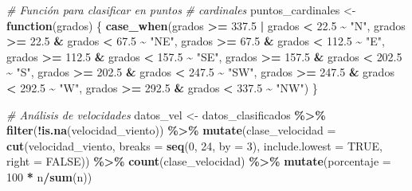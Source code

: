 \documentclass[
]{article}
\newenvironment{Shaded}{\begin{snugshade}}{\end{snugshade}}
\newcommand{\AttributeTok}[1]{\textcolor[rgb]{0.13,0.29,0.53}{#1}}
\newcommand{\CommentTok}[1]{\textcolor[rgb]{0.56,0.35,0.01}{\textit{#1}}}
\newcommand{\ConstantTok}[1]{\textcolor[rgb]{0.56,0.35,0.01}{#1}}
\newcommand{\ControlFlowTok}[1]{\textcolor[rgb]{0.13,0.29,0.53}{\textbf{#1}}}
\newcommand{\DecValTok}[1]{\textcolor[rgb]{0.00,0.00,0.81}{#1}}
\newcommand{\FloatTok}[1]{\textcolor[rgb]{0.00,0.00,0.81}{#1}}
\newcommand{\FunctionTok}[1]{\textcolor[rgb]{0.13,0.29,0.53}{\textbf{#1}}}
\newcommand{\NormalTok}[1]{#1}
\newcommand{\OtherTok}[1]{\textcolor[rgb]{0.56,0.35,0.01}{#1}}
\newcommand{\SpecialCharTok}[1]{\textcolor[rgb]{0.81,0.36,0.00}{\textbf{#1}}}
\newcommand{\StringTok}[1]{\textcolor[rgb]{0.31,0.60,0.02}{#1}}
\begin{document}
\begin{Shaded}
\begin{Highlighting}[]
\CommentTok{\# Función para clasificar en puntos}
\CommentTok{\# cardinales}
\NormalTok{puntos\_cardinales }\OtherTok{\textless{}{-}} \ControlFlowTok{function}\NormalTok{(grados) \{}
    \FunctionTok{case\_when}\NormalTok{(grados }\SpecialCharTok{\textgreater{}=} \FloatTok{337.5} \SpecialCharTok{|}\NormalTok{ grados }\SpecialCharTok{\textless{}}
        \FloatTok{22.5} \SpecialCharTok{\textasciitilde{}} \StringTok{"N"}\NormalTok{, grados }\SpecialCharTok{\textgreater{}=} \FloatTok{22.5} \SpecialCharTok{\&}\NormalTok{ grados }\SpecialCharTok{\textless{}}
        \FloatTok{67.5} \SpecialCharTok{\textasciitilde{}} \StringTok{"NE"}\NormalTok{, grados }\SpecialCharTok{\textgreater{}=} \FloatTok{67.5} \SpecialCharTok{\&}\NormalTok{ grados }\SpecialCharTok{\textless{}}
        \FloatTok{112.5} \SpecialCharTok{\textasciitilde{}} \StringTok{"E"}\NormalTok{, grados }\SpecialCharTok{\textgreater{}=} \FloatTok{112.5} \SpecialCharTok{\&}\NormalTok{ grados }\SpecialCharTok{\textless{}}
        \FloatTok{157.5} \SpecialCharTok{\textasciitilde{}} \StringTok{"SE"}\NormalTok{, grados }\SpecialCharTok{\textgreater{}=} \FloatTok{157.5} \SpecialCharTok{\&}\NormalTok{ grados }\SpecialCharTok{\textless{}}
        \FloatTok{202.5} \SpecialCharTok{\textasciitilde{}} \StringTok{"S"}\NormalTok{, grados }\SpecialCharTok{\textgreater{}=} \FloatTok{202.5} \SpecialCharTok{\&}\NormalTok{ grados }\SpecialCharTok{\textless{}}
        \FloatTok{247.5} \SpecialCharTok{\textasciitilde{}} \StringTok{"SW"}\NormalTok{, grados }\SpecialCharTok{\textgreater{}=} \FloatTok{247.5} \SpecialCharTok{\&}\NormalTok{ grados }\SpecialCharTok{\textless{}}
        \FloatTok{292.5} \SpecialCharTok{\textasciitilde{}} \StringTok{"W"}\NormalTok{, grados }\SpecialCharTok{\textgreater{}=} \FloatTok{292.5} \SpecialCharTok{\&}\NormalTok{ grados }\SpecialCharTok{\textless{}}
        \FloatTok{337.5} \SpecialCharTok{\textasciitilde{}} \StringTok{"NW"}\NormalTok{)}
\NormalTok{\}}

\CommentTok{\# Análisis de velocidades}
\NormalTok{datos\_vel }\OtherTok{\textless{}{-}}\NormalTok{ datos\_clasificados }\SpecialCharTok{\%\textgreater{}\%}
    \FunctionTok{filter}\NormalTok{(}\SpecialCharTok{!}\FunctionTok{is.na}\NormalTok{(velocidad\_viento)) }\SpecialCharTok{\%\textgreater{}\%}
    \FunctionTok{mutate}\NormalTok{(}\AttributeTok{clase\_velocidad =} \FunctionTok{cut}\NormalTok{(velocidad\_viento,}
        \AttributeTok{breaks =} \FunctionTok{seq}\NormalTok{(}\DecValTok{0}\NormalTok{, }\DecValTok{24}\NormalTok{, }\AttributeTok{by =} \DecValTok{3}\NormalTok{), }\AttributeTok{include.lowest =} \ConstantTok{TRUE}\NormalTok{,}
        \AttributeTok{right =} \ConstantTok{FALSE}\NormalTok{)) }\SpecialCharTok{\%\textgreater{}\%}
    \FunctionTok{count}\NormalTok{(clase\_velocidad) }\SpecialCharTok{\%\textgreater{}\%}
    \FunctionTok{mutate}\NormalTok{(}\AttributeTok{porcentaje =} \DecValTok{100} \SpecialCharTok{*}\NormalTok{ n}\SpecialCharTok{/}\FunctionTok{sum}\NormalTok{(n))}


\end{Highlighting}
\end{Shaded}
\end{document}

